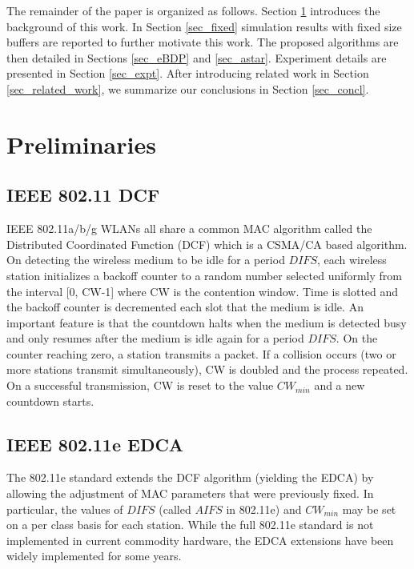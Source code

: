 \documentclass[10pt,twocolumn, journal]{IEEEtran}
\begin{document}
The remainder of the paper is organized as follows. Section \ref{sec_background}
introduces the background of this work. In Section \ref{sec_fixed} simulation results
with fixed size buffers are reported to further motivate this work. The proposed algorithms are then detailed in Sections \ref{sec_eBDP} and \ref{sec_astar}. Experiment details are presented in Section \ref{sec_expt}. After introducing related work in Section \ref{sec_related_work}, we summarize our conclusions
in Section \ref{sec_concl}.

\section{Preliminaries}\label{sec_background}

\subsection{IEEE 802.11 DCF}
IEEE 802.11a/b/g WLANs all share a common MAC algorithm called the Distributed Coordinated Function (DCF) which is a CSMA/CA based algorithm.   On detecting the wireless medium to be idle
for a period $DIFS$, each wireless station initializes a backoff counter to a random
number selected uniformly from the interval [0, CW-1] where CW is the contention window.
Time is slotted and the backoff counter is decremented each slot that the medium is idle.
An important feature is that the countdown halts when the medium is detected busy and
only resumes after the medium is idle again for a period $DIFS$.  On the counter reaching
zero, a station transmits a packet.  If a collision occurs (two or more stations transmit
simultaneously), CW is doubled and the process repeated. On a successful transmission, CW
is reset to the value $CW_{min}$ and a new countdown starts.

\subsection{IEEE 802.11e EDCA}
The 802.11e standard extends the DCF algorithm (yielding the EDCA) by allowing the
adjustment of MAC parameters that were previously fixed.    In particular, the values of
$DIFS$ (called $AIFS$ in 802.11e) and $CW_{min}$ may be set on a per class basis for each
station.    While the full 802.11e standard is not implemented in current commodity
hardware, the EDCA extensions have been widely implemented for some years.
\end{document}
